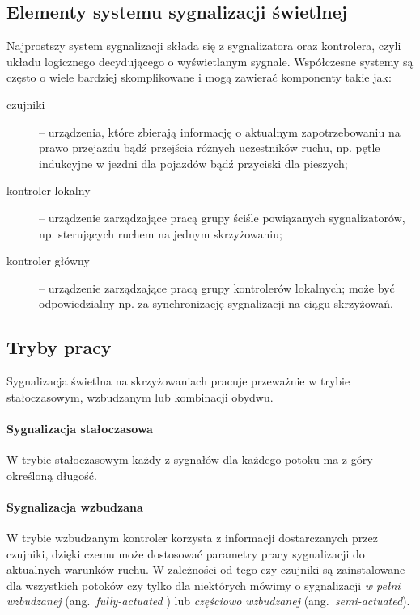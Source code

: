 \documentclass{pracamgr}
\newcommand{\ang}[1]{(ang.~\emph{#1})}
\begin{document}
\subsection{Elementy systemu sygnalizacji świetlnej}
\label{ss:elementy}
Najprostszy system sygnalizacji składa się z sygnalizatora oraz
kontrolera, czyli układu logicznego decydującego o wyświetlanym
sygnale. Współczesne systemy są często o wiele bardziej skomplikowane
i mogą zawierać komponenty takie jak:
\begin{description}
  \item[czujniki] -- urządzenia, które zbierają informację o aktualnym
  zapotrzebowaniu na prawo przejazdu bądź przejścia różnych
  uczestników ruchu, np. pętle indukcyjne w jezdni dla pojazdów bądź
  przyciski dla pieszych;
  \item[kontroler lokalny] -- urządzenie zarządzające pracą grupy
  ściśle powiązanych sygnalizatorów, np. sterujących ruchem na jednym
  skrzyżowaniu;
  \item[kontroler główny] -- urządzenie zarządzające pracą grupy
  kontrolerów lokalnych; może być odpowiedzialny np. za synchronizację
  sygnalizacji na ciągu skrzyżowań.
\end{description}

\subsection{Tryby pracy}
\label{ss:tryby}
Sygnalizacja świetlna na skrzyżowaniach pracuje przeważnie w trybie
stałoczasowym, wzbudzanym lub kombinacji obydwu.

\paragraph{Sygnalizacja stałoczasowa}
W trybie stałoczasowym każdy z sygnałów dla każdego potoku ma z góry
określoną długość.

\paragraph{Sygnalizacja wzbudzana}
W trybie wzbudzanym kontroler korzysta z informacji dostarczanych
przez czujniki, dzięki czemu może dostosować parametry pracy
sygnalizacji do aktualnych warunków ruchu. W zależności od tego czy
czujniki są zainstalowane dla wszystkich potoków czy tylko dla
niektórych mówimy o sygnalizacji \emph{w pełni wzbudzanej}
\ang{fully-actuated } lub \emph{częściowo wzbudzanej}
\ang{semi-actuated}.
\end{document}
